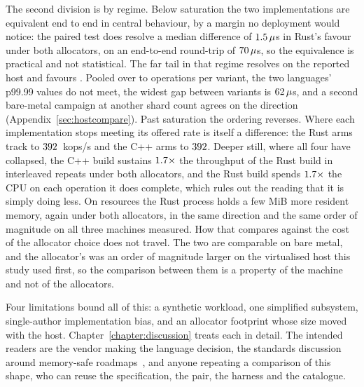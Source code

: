 \documentclass[english,oneside,a4paper,censored,csm,software-track-2020]{HYthesisML}
\begin{document}
The second division is by regime. Below saturation the two implementations are equivalent end to
end in central behaviour, by a margin no deployment would notice: the paired test does resolve a
median difference of $1.5\,\mu$s in Rust's favour under both allocators, on an
end-to-end round-trip of $70\,\mu$s, so the equivalence is practical and not
statistical. The far tail in that regime resolves on the reported host and favours
\FarTailLower{}. Pooled over \FarTailSamplesMin{} to \FarTailSamplesMax{} operations per variant,
the two languages' p99.99 values do not meet, the widest gap between variants is
$62\,\mu$s, and a second bare-metal campaign at another shard count agrees on the
direction (Appendix~\ref{sec:hostcompare}). Past saturation the ordering reverses. Where each
implementation stops meeting its offered rate is itself a difference: the Rust arms track to
$392$~kops/s and the C++ arms to $392$. Deeper still, where all four
have collapsed, the C++ build sustains $1.7\times$ the throughput of the Rust build
in \OverloadThrAgree{} interleaved repeats under both allocators, and the Rust build spends
$1.7\times$ the CPU on each operation it does complete, which rules out the
reading that it is simply doing less. On resources the Rust process holds a few MiB more resident
memory, again under both allocators, in the same direction and the same order of magnitude on all
three machines measured. How that compares against the cost of the allocator choice does not
travel. The two are comparable on bare metal, and the allocator's was an order of magnitude larger
on the virtualised host this study used first, so the comparison between them is a property of
the machine and not of the allocators.

Four limitations bound all of this: a synthetic workload, one simplified subsystem,
single-author implementation bias, and an allocator footprint whose size moved with the host.
Chapter~\ref{chapter:discussion} treats each in detail. The intended readers are the vendor
making the language decision, the standards discussion around memory-safe
roadmaps~\cite{cisa2023memorysafe,oncd2024building}, and anyone repeating a comparison of this
shape, who can reuse the specification, the pair, the harness and the catalogue.
\end{document}
